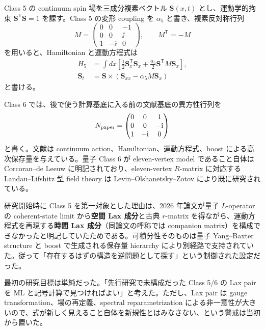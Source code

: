 Class 5 の continuum spin 場を三成分複素ベクトル $\boldsymbol S(x,t)$ とし、運動学的拘束 $\boldsymbol S^{\mathsf T}\boldsymbol S=1$ を課す。Class 5 の変形 coupling を $\alpha_5$ と書き、複素反対称行列
\begin{equation}
M=\begin{pmatrix}0&0&-1\\0&0&\ii\\1&-\ii&0\end{pmatrix},\qquad M^{\mathsf T}=-M
\label{eq:intro:M5}
\end{equation}
を用いると、Hamiltonian と運動方程式は
\begin{align}
H_5&=\int dx\left[\frac12\boldsymbol S_x^{\mathsf T}\boldsymbol S_x+
\frac{\alpha_5}{2}\boldsymbol S^{\mathsf T}M\boldsymbol S_x\right],
\label{eq:intro:H5}\\
\boldsymbol S_t&=\boldsymbol S\times(\boldsymbol S_{xx}-\alpha_5M\boldsymbol S_x)
\label{eq:intro:E5}
\end{align}
と書ける\cite{DFN2026}。

Class 6 では、後で使う計算基底に入る前の文献基底の異方性行列を
\begin{equation}
N_{\rm paper}=\begin{pmatrix}0&0&1\\0&0&-\mathrm i\\1&-\mathrm i&0\end{pmatrix}
\label{eq:intro:N6paper}
\end{equation}
と書く。文献は continuum action、Hamiltonian、運動方程式、boost による高次保存量を与えている\cite{DFN2026}。量子 Class 6 が eleven-vertex model であること自体は Corcoran--de Leeuw に明記されており\cite{CdL2024}、eleven-vertex $R$-matrix に対応する Landau--Lifshitz 型 field theory は Levin--Olshanetsky--Zotov により既に研究されている\cite{LOZ2014}。

研究開始時に Class 5 を第一対象とした理由は、2026 年論文が量子 $L$-operator の coherent-state limit から\textbf{空間 Lax 成分}と古典 $r$-matrix を得ながら、運動方程式を再現する\textbf{時間 Lax 成分}（同論文の呼称では companion matrix）を構成できなかったと明記していたためである\cite{DFN2026}。可積分性そのものは量子 Yang--Baxter structure と boost で生成される保存量 hierarchy により別経路で支持されていた。従って「存在するはずの構造を逆問題として探す」という制御された設定だった。

\begin{historymemo}
最初の研究目標は単純だった。「先行研究で未構成だった Class 5/6 の Lax pair を ML と記号計算で見つければよい」と考えた。ただし、Lax pair は gauge transformation、場の再定義、spectral reparametrization による非一意性が大きいので、式が新しく見えること自体を新規性とはみなさない、という警戒は当初から置いた。
\end{historymemo}

